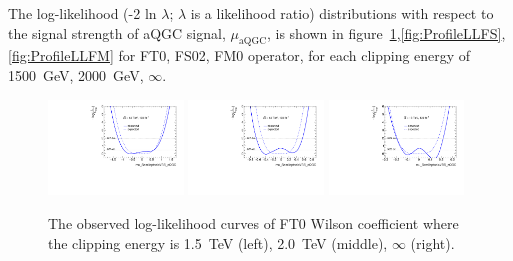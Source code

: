 The log-likelihood (-2 ln $\lambda$; $\lambda$ is a likelihood ratio) distributions with respect to the signal strength of aQGC signal, $\mu_{\mathrm{aQGC}}$, is shown in figure~\ref{fig:ProfileLL},\ref{fig:ProfileLLFS}, \ref{fig:ProfileLLFM} for FT0, FS02, FM0 operator, for each clipping energy of 1500~GeV, 2000~GeV, $\infty$.
\begin{figure}[ht]
    \centering
    \includegraphics[width=0.32\textwidth]{figures/aQGC/profileFT01500}
    	\includegraphics[width=0.32\textwidth]{figures/aQGC/profileFT02000}
        \includegraphics[width=0.32\textwidth]{figures/aQGC/profileFT0inf}
        \caption{The observed log-likelihood curves of FT0 Wilson coefficient where the clipping energy is 1.5~TeV (left), 2.0~TeV (middle), $\infty$ (right).}
        \label{fig:ProfileLL}
\end{figure}
